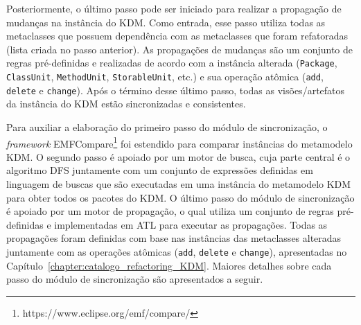 Posteriormente, o último passo pode ser iniciado para realizar a propagação de mudanças na instância do KDM. Como entrada, esse passo utiliza todas as metaclasses que possuem dependência com as metaclasses que foram refatoradas (lista criada no passo anterior). As propagações de mudanças são um conjunto de regras pré-definidas e realizadas de acordo com a instância alterada (\texttt{Package}, \texttt{ClassUnit}, \texttt{MethodUnit}, \texttt{StorableUnit}, etc.) e sua operação atômica (\texttt{add}, \texttt{delete} e \texttt{change}). Após o término desse último passo, todas as visões/artefatos da instância do KDM estão sincronizadas e consistentes.


Para auxiliar a elaboração do primeiro passo do módulo de sincronização, o \textit{framework} EMFCompare\footnote{https://www.eclipse.org/emf/compare/} foi estendido para comparar instâncias do metamodelo KDM. O segundo passo é apoiado por um motor de busca, cuja parte central é o algoritmo DFS juntamente com um conjunto de expressões definidas em linguagem de buscas que são executadas em uma instância do metamodelo KDM para obter todos os pacotes do KDM. O último passo do módulo de sincronização é apoiado por um motor de propagação, o qual utiliza um conjunto de regras pré-definidas e implementadas em ATL para executar as propagações. Todas as propagações foram definidas com base nas instâncias das metaclasses alteradas juntamente com as operações atômicas (\texttt{add}, \texttt{delete} e \texttt{change}), apresentadas no Capítulo~\ref{chapter:catalogo_refactoring_KDM}. Maiores detalhes sobre cada passo do módulo de sincronização são apresentados a seguir. %

